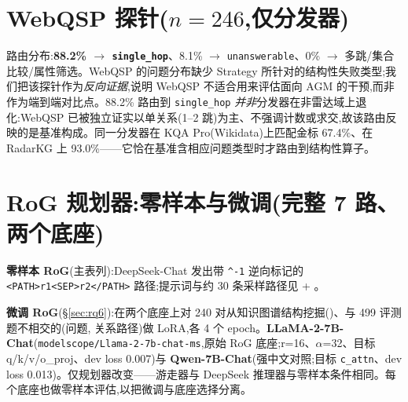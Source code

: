 \documentclass[11pt,a4paper]{article}
\newcommand{\qtype}[1]{\texttt{\small #1}}
\begin{document}
\section{WebQSP 探针(\texorpdfstring{$n=246$}{n=246},仅分发器)}
\label{app:webqsp}

路由分布:\textbf{88.2\% $\to$ \qtype{single\_hop}}、8.1\% $\to$ \qtype{unanswerable}、0\% $\to$ 多跳/集合比较/属性筛选。WebQSP 的问题分布缺少 Strategy 所针对的结构性失败类型;我们把该探针作为\emph{反向证据},说明 WebQSP 不适合用来评估面向 AGM 的干预,而非作为端到端对比点。88.2\% 路由到 \qtype{single\_hop} \emph{并非}分发器在非雷达域上退化:WebQSP 已被独立证实以单关系(1--2 跳)为主、不强调计数或求交,故该路由反映的是基准构成。同一分发器在 KQA Pro(Wikidata)上匹配金标 67.4\%、在 RadarKG 上 93.0\%——它恰在基准含相应问题类型时才路由到结构性算子。

\section{RoG 规划器:零样本与微调(完整 7 路、两个底座)}
\label{app:rog}

\textbf{零样本 RoG}(主表列):DeepSeek-Chat 发出带 \texttt{\^{}-1} 逆向标记的 \texttt{<PATH>r1<SEP>r2</PATH>} 路径;提示词与约 30 条采样路径见  + 。

\textbf{微调 RoG}(\S\ref{sec:rq6}):在两个底座上对 240 对从知识图谱结构挖掘()、与 499 评测题不相交的(问题, 关系路径)做 LoRA,各 4 个 epoch。\textbf{LLaMA-2-7B-Chat}(\texttt{modelscope/Llama-2-7b-chat-ms},原始 RoG 底座;r=16、$\alpha$=32、目标 q/k/v/o\_proj、dev loss 0.007)与 \textbf{Qwen-7B-Chat}(强中文对照;目标 \texttt{c\_attn}、dev loss 0.013)。仅规划器改变——游走器与 DeepSeek 推理器与零样本条件相同。每个底座也做零样本评估,以把微调与底座选择分离。
\end{document}
